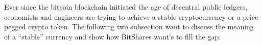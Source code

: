 Ever since the bitcoin blockchain initiated the age of decentral public
ledgers, economists and engineers are trying to achieve a stable cryptocurrency
or a price pegged crypto token. The following two subsection want to discuss
the meaning of a ``stable'' currency and show how BitShares want's to fill the
gap.

